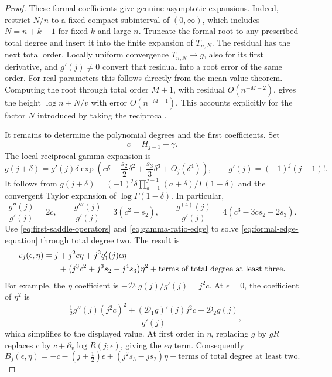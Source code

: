 \documentclass[11pt]{article}
\numberwithin{equation}{section}
\theoremstyle{definition}
\theoremstyle{remark}
\begin{document}
\begin{proof}
These formal coefficients give genuine asymptotic expansions.
Indeed, restrict $N/n$ to a fixed compact subinterval of $(0,\infty)$,
which includes $N=n+k-1$ for fixed $k$ and large $n$.  Truncate the
formal root to any prescribed total degree and insert it into the
finite expansion of $T_{n,N}$.  The residual has the next total
order.  Locally uniform convergence $T_{n,N}\to g$, also for its
first derivative, and $g'(j)\ne0$ convert that residual into a root
error of the same order.  For real parameters this follows directly
from the mean value theorem.  Computing the root through total
order $M+1$, with residual $O(n^{-M-2})$, gives the height
$\log n+N/v$ with error $O(n^{-M-1})$.  This accounts explicitly
for the factor $N$ introduced by taking the reciprocal.

It remains to determine the polynomial degrees and the first
coefficients.  Set
\[
 c=H_{j-1}-\gamma.
\]
The local reciprocal-gamma expansion is
\begin{equation}\label{eq:reciprocal-gamma-at-integer}
 g(j+\delta)=g'(j)\delta
     \exp\left(c\delta-\frac{s_2}2\delta^2
                   +\frac{s_3}3\delta^3+O_j(\delta^4)\right),
 \qquad g'(j)=(-1)^j(j-1)!.
\end{equation}
It follows from
$g(j+\delta)=(-1)^j\delta\prod_{a=1}^{j-1}(a+\delta)/\Gamma(1-\delta)$
and the convergent Taylor expansion of $\log\Gamma(1-\delta)$.
In particular,
\[
 \frac{g''(j)}{g'(j)}=2c,\qquad
 \frac{g'''(j)}{g'(j)}=3(c^2-s_2),\qquad
 \frac{g^{(4)}(j)}{g'(j)}=4(c^3-3cs_2+2s_3).
\]
Use \eqref{eq:first-saddle-operators} and
\eqref{eq:gamma-ratio-edge} to solve
\eqref{eq:formal-edge-equation} through total degree two.  The result is
\begin{align}\label{eq:formal-reciprocal-root-two-terms}
 v_j(\epsilon,\eta)=j
   &+j^2c\eta+j^2q_1'(j)\epsilon\eta\\
   &+\bigl(j^3c^2+j^3s_2-j^4s_3\bigr)\eta^2
       +\text{terms of total degree at least three}.\notag
\end{align}
For example, the $\eta$ coefficient is
$-\mathcal D_1g(j)/g'(j)=j^2c$.  At $\epsilon=0$, the coefficient
of $\eta^2$ is
\[
 -\frac{\frac12g''(j)(j^2c)^2
      +(\mathcal D_1g)'(j)j^2c+\mathcal D_2g(j)}{g'(j)},
\]
which simplifies to the displayed value.  At first order in $\eta$,
replacing $g$ by $gR$ replaces $c$ by
$c+\partial_v\log R(j;\epsilon)$, giving the $\epsilon\eta$ term.
Consequently
\begin{equation}\label{eq:formal-height-first-coefficients}
 B_j(\epsilon,\eta)=-c
       -(j+\tfrac12)\epsilon+(j^2s_3-js_2)\eta
       +\text{terms of total degree at least two}.
\end{equation}


\end{proof}
\end{document}
